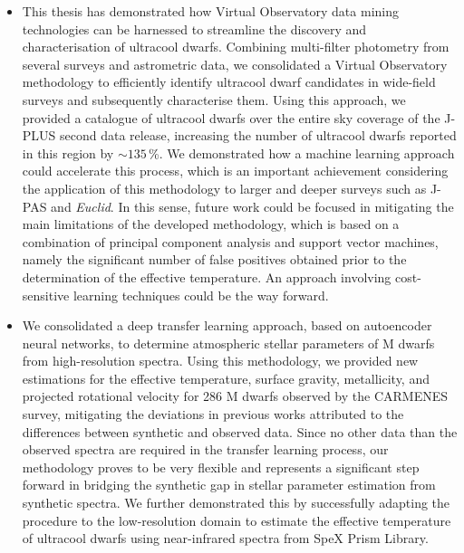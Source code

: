 \begin{itemize}

    \item This thesis has demonstrated how Virtual Observatory data mining technologies can be harnessed to streamline the discovery and characterisation of ultracool dwarfs. Combining multi-filter photometry from several surveys and astrometric data, we consolidated a Virtual Observatory methodology to efficiently identify ultracool dwarf candidates in wide-field surveys and subsequently characterise them. Using this approach, we provided a catalogue of ultracool dwarfs over the entire sky coverage of the J-PLUS second data release, increasing the number of ultracool dwarfs reported in this region by $\sim135$\,\%. We demonstrated how a machine learning approach could accelerate this process, which is an important achievement considering the application of this methodology to larger and deeper surveys such as J-PAS and \textit{Euclid}. In this sense, future work could be focused in mitigating the main limitations of the developed methodology, which is based on a combination of principal component analysis and support vector machines, namely the significant number of false positives obtained prior to the determination of the effective temperature. An approach involving cost-sensitive learning techniques \citep{cost_sensitive} could be the way forward.


    \item We consolidated a deep transfer learning approach, based on autoencoder neural networks, to determine atmospheric stellar parameters of M dwarfs from high-resolution spectra. Using this methodology, we provided new estimations for the effective temperature, surface gravity, metallicity, and projected rotational velocity for 286 M dwarfs observed by the CARMENES survey, mitigating the deviations in previous works attributed to the differences between synthetic and observed data. Since no other data than the observed spectra are required in the transfer learning process, our methodology proves to be very flexible and represents a significant step forward in bridging the synthetic gap in stellar parameter estimation from synthetic spectra. We further demonstrated this by successfully adapting the procedure to the low-resolution domain to estimate the effective temperature of ultracool dwarfs using near-infrared spectra from SpeX Prism Library.



\end{itemize}
